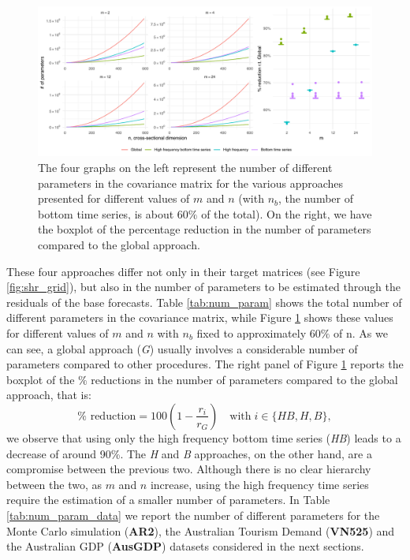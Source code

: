 \documentclass[a4paper,11pt]{article}
\theoremstyle{definition}
\begin{document}
\begin{figure}[!tbp]
	\centering
	\includegraphics[width = \linewidth]{fig/shr_cov/parameters.pdf}
	\caption{The four graphs on the left represent the number of different parameters in the covariance matrix for the various approaches presented for different values of $m$ and $n$ (with $n_b$, the number of bottom time series, is about $60\%$ of the total). On the right, we have the boxplot of the percentage reduction in the number of parameters compared to the global approach.}
	\label{fig:num_param}
	\end{figure}

These four approaches differ not only in their target matrices (see Figure \ref{fig:shr_grid}), but also in the number of parameters to be estimated through the residuals of the base forecasts. Table \ref{tab:num_param} shows the total number of different parameters in the covariance matrix, while Figure \ref{fig:num_param} shows these values for different values of $m$ and $n$ with $n_b$ fixed to approximately $60\%$ of n. As we can see, a global approach (\textit{G}) usually involves a considerable number of parameters compared to other procedures. The right panel of Figure \ref{fig:num_param} reports the boxplot of the $\%$ reductions in the number of parameters compared to the global approach, that is:
$$
\% \text{ reduction} = 100\left(1-\frac{r_i}{r_G}\right) \quad \mathrm{with} \; i \in \{HB, H, B\},
$$
we observe that using only the high frequency bottom time series (\textit{HB}) leads to a decrease of around 90\%. The \textit{H} and \textit{B} approaches, on the other hand, are a compromise between the previous two. Although there is no clear hierarchy between the two, as $m$ and $n$ increase, using the high frequency time series require the estimation of a smaller number of parameters. In Table \ref{tab:num_param_data} we report the number of different parameters for the Monte Carlo simulation (\textbf{AR2}), the Australian Tourism Demand (\textbf{VN525}) and the Australian GDP (\textbf{AusGDP}) datasets considered in the next sections.
\end{document}
